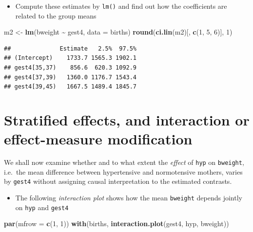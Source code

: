 \documentclass[
]{book}
\newenvironment{Shaded}{\begin{snugshade}}{\end{snugshade}}
\newcommand{\AttributeTok}[1]{\textcolor[rgb]{0.13,0.29,0.53}{#1}}
\newcommand{\DecValTok}[1]{\textcolor[rgb]{0.00,0.00,0.81}{#1}}
\newcommand{\FunctionTok}[1]{\textcolor[rgb]{0.13,0.29,0.53}{\textbf{#1}}}
\newcommand{\NormalTok}[1]{#1}
\newcommand{\OtherTok}[1]{\textcolor[rgb]{0.56,0.35,0.01}{#1}}
\newcommand{\SpecialCharTok}[1]{\textcolor[rgb]{0.81,0.36,0.00}{\textbf{#1}}}
\providecommand{\tightlist}{%
  \setlength{\itemsep}{0pt}\setlength{\parskip}{0pt}}
\begin{document}
\begin{itemize}
\tightlist
\item
  Compute these estimates by \texttt{lm()} and find out how the coefficients are related to the group means
\end{itemize}

\begin{Shaded}
\begin{Highlighting}[]
\NormalTok{m2 }\OtherTok{\textless{}{-}} \FunctionTok{lm}\NormalTok{(bweight }\SpecialCharTok{\textasciitilde{}}\NormalTok{ gest4, }\AttributeTok{data =}\NormalTok{ births)}
\FunctionTok{round}\NormalTok{(}\FunctionTok{ci.lin}\NormalTok{(m2)[, }\FunctionTok{c}\NormalTok{(}\DecValTok{1}\NormalTok{, }\DecValTok{5}\NormalTok{, }\DecValTok{6}\NormalTok{)], }\DecValTok{1}\NormalTok{)}
\end{Highlighting}
\end{Shaded}

\begin{verbatim}
##              Estimate   2.5%  97.5%
## (Intercept)    1733.7 1565.3 1902.1
## gest4[35,37)    856.6  620.3 1092.9
## gest4[37,39)   1360.0 1176.7 1543.4
## gest4[39,45)   1667.5 1489.4 1845.7
\end{verbatim}

\section{Stratified effects, and interaction or effect-measure modification}\label{stratified-effects-and-interaction-or-effect-measure-modification}

We shall now examine whether and to what extent the
\emph{effect} of \texttt{hyp} on \texttt{bweight}, i.e.~the
mean difference between hypertensive and normotensive mothers,
varies by \texttt{gest4} without assigning
causal interpretation to the estimated contrasts.

\begin{itemize}
\tightlist
\item
  The following \emph{interaction plot}
  shows how the mean \texttt{bweight} depends jointly on \texttt{hyp} and \texttt{gest4}
\end{itemize}

\begin{Shaded}
\begin{Highlighting}[]
\FunctionTok{par}\NormalTok{(}\AttributeTok{mfrow =} \FunctionTok{c}\NormalTok{(}\DecValTok{1}\NormalTok{, }\DecValTok{1}\NormalTok{))}
\FunctionTok{with}\NormalTok{(births, }\FunctionTok{interaction.plot}\NormalTok{(gest4, hyp, bweight))}
\end{Highlighting}
\end{Shaded}
\end{document}
